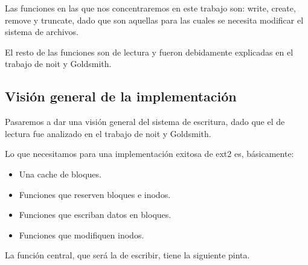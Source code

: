 Las funciones en las que nos concentraremos en este trabajo son: write, create, remove y truncate, dado que son aquellas para las cuales se necesita modificar el sistema de archivos.

El resto de las funciones son de lectura y fueron debidamente explicadas en el trabajo de noit y Goldsmith.


\subsection{Visión general de la implementación}

Pasaremos a dar una visión general del sistema de escritura, dado que el de lectura fue analizado en el trabajo de noit y Goldsmith.

Lo que necesitamos para una implementación exitosa de ext2 es, básicamente:

\begin{itemize}
  \item Una cache de bloques.
  \item Funciones que reserven bloques e inodos.
  \item Funciones que escriban datos en bloques.
  \item Funciones que modifiquen inodos.
\end{itemize}

La función central, que será la de escribir, tiene la siguiente pinta.


